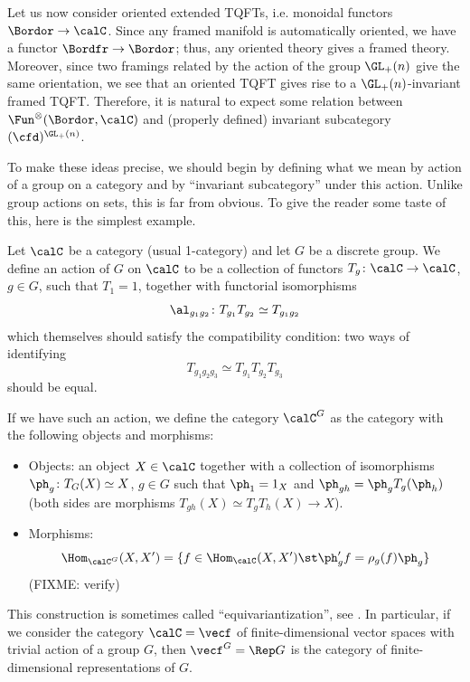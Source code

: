 Let us now consider oriented extended TQFTs, i.e. monoidal functors $\Bordor\to
\calC$. Since any framed manifold is automatically oriented, we have a functor
$\Bordfr\to\Bordor$; thus, any oriented theory  gives a framed
  theory. Moreover, since  two framings related by the action of the group
$\GL_+(n)$ give the same orientation, we see that an oriented TQFT gives rise to
a $\GL_+(n)$-invariant framed TQFT. Therefore, it is natural to expect some
relation between $\Fun^{\otimes}(\Bordor, \calC)$ and (properly defined)
invariant subcategory $(\cfd)^{\GL_+(n)}$.

To make these ideas precise, we should begin by defining what we mean by action
of a group on a category and by ``invariant subcategory'' under this action.
Unlike group actions on sets, this is far from  obvious. To give the reader some
taste of this, here is the simplest example.

\begin{example}\label{x:group-action-1cat}
  Let $\calC$ be a category (usual 1-category) and let $G$ be a discrete group.
  We define an action of $G$ on $\calC$ to be a collection of functors
  $T_g\colon \calC\to \calC$, $ g\in G$, such that $T_1 = 1$, together
  with functorial isomorphisms
  $$
    \al_{g_1g_2}\colon  T_{g_1}T_{g_2}\simeq T_{g_1g_2}
  $$
  which themselves should satisfy the  compatibility condition: two ways of
  identifying
  $$
    T_{g_1g_2g_3}\simeq T_{g_1}T_{g_2}T_{g_3}
  $$
  should be equal.

  If we have such an action, we define the category $\calC^G$ as the category
  with the following objects and morphisms:
  \begin{itemize}
    \item Objects: an object $X\in \calC$ together with a collection of
    isomorphisms $\ph_g\colon T_G(X)\simeq X$, $g\in G$ such that
    $\ph_1=1_X$ and $\ph_{gh}=\ph_g  T_g (\ph_h)$ (both sides are morphisms
    $T_{gh}(X)\simeq T_{g}T_h(X)\to X$).
    \item Morphisms:
    $$
    \Hom_{\calC^G}(X, X')=\{f\in \Hom_{\calC} (X,X')\st \ph'_g f = \rho_g(f)
    \ph_g\}
    $$
    (FIXME: verify)
  \end{itemize}
  This construction is sometimes called ``equivariantization'', see
  \cite[Section 2.7]{etingof-fusion}.
  In particular, if we consider the category $\calC=\vecf$ of finite-dimensional
  vector spaces with trivial action of a group $G$, then $\vecf^G=\Rep G$ is the
  category of finite-dimensional representations of $G$.
\end{example}



